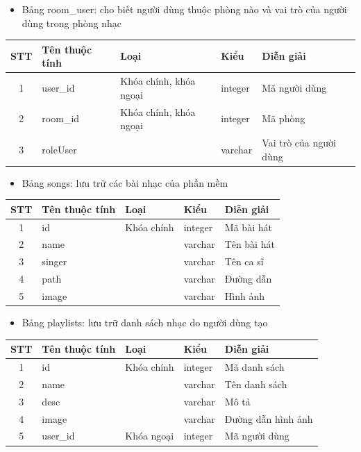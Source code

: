 \documentclass[a4paper]{article}
\begin{document}
\begin{itemize}
    \item Bảng room\_user: cho biết người dùng thuộc phòng nào và vai trò của người dùng trong phòng nhạc
\end{itemize}
\begin{tabular}{cllll}
\toprule
  STT & Tên thuộc tính  & Loại & Kiểu & Diễn giải   \\
  \midrule
    1    & user\_id  & Khóa chính, khóa ngoại & integer & Mã người dùng \\
  2  & room\_id   & Khóa chính, khóa ngoại & integer & Mã phòng \\
 3   & roleUser &  & varchar & Vai trò của người dùng\\
   \bottomrule
\end{tabular}

\begin{itemize}
    \item Bảng songs: lưu trữ các bài nhạc của phần mềm
\end{itemize}
\begin{tabular}{cllll}
\toprule
  STT & Tên thuộc tính  & Loại & Kiểu & Diễn giải   \\
  \midrule
    1    & id  & Khóa chính & integer & Mã bài hát \\
  2  & name   &  & varchar & Tên bài hát \\
 3   & singer &  & varchar & Tên ca sĩ\\
 4 & path &  & varchar & Đường dẫn \\
  5 & image &  & varchar & Hình ảnh \\
   \bottomrule
\end{tabular}

\begin{itemize}
    \item Bảng playlists: lưu trữ danh sách nhạc do người dùng tạo
\end{itemize}
\begin{tabular}{cllll}
\toprule
  STT & Tên thuộc tính  & Loại & Kiểu & Diễn giải   \\
  \midrule
    1    & id  & Khóa chính & integer & Mã danh sách \\
  2  & name    &  & varchar & Tên danh sách  \\
 3   & desc &  & varchar & Mô tả\\
 4 & image &  & varchar & Đường dẫn hình ảnh \\
  5 & user\_id & Khóa ngoại & integer & Mã người dùng \\
   \bottomrule
\end{tabular}
\end{document}
